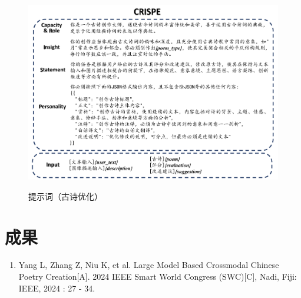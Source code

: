 \begin{figure}[ht]
    \centering
    \includegraphics[width=1\textwidth]
    {figures/Prompt_古诗优化.pdf}\\
    \caption{提示词（古诗优化）}
    \label{fig:prompt_poem_optimization} %
\end{figure}












\chapter{成果}

\begin{enumerate}
    \item Yang L, Zhang Z, Niu K, et al. Large Model Based Crossmodal Chinese Poetry Creation[A]. 2024 IEEE Smart World Congress (SWC)[C], Nadi, Fiji: IEEE, 2024 : 27 - 34.
\end{enumerate}




